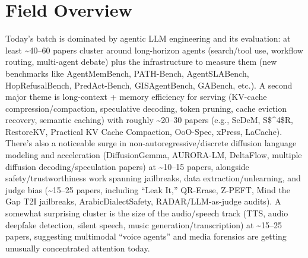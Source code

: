 \documentclass[12pt,letterpaper]{article}
\begin{document}
\section*{Field Overview}
{\footnotesize Today's batch is dominated by agentic LLM engineering and its evaluation: at least \textasciitilde{}40--60 papers cluster around long-horizon agents (search/tool use, workflow routing, multi-agent debate) plus the infrastructure to measure them (new benchmarks like AgentMemBench, PATH-Bench, AgentSLABench, HopRefusalBench, PredAct-Bench, GISAgentBench, GABench, etc.). A second major theme is long-context + memory efficiency for serving (KV-cache compression/compaction, speculative decoding, token pruning, cache eviction recovery, semantic caching) with roughly \textasciitilde{}20--30 papers (e.g., SeDeM, S\$\textasciicircum{}4\$R, RestoreKV, Practical KV Cache Compaction, OoO-Spec, xPress, LaCache). There's also a noticeable surge in non-autoregressive/discrete diffusion language modeling and acceleration (DiffusionGemma, AURORA-LM, DeltaFlow, multiple diffusion decoding/speculation papers) at \textasciitilde{}10--15 papers, alongside safety/trustworthiness work spanning jailbreaks, data extraction/unlearning, and judge bias (\textasciitilde{}15--25 papers, including ``Leak It,'' QR-Erase, Z-PEFT, Mind the Gap T2I jailbreaks, ArabicDialectSafety, RADAR/LLM-as-judge audits). A somewhat surprising cluster is the size of the audio/speech track (TTS, audio deepfake detection, silent speech, music generation/transcription) at \textasciitilde{}15--25 papers, suggesting multimodal ``voice agents'' and media forensics are getting unusually concentrated attention today.}
\end{document}
